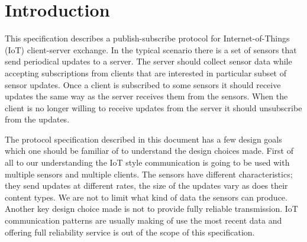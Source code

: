 \chapter{Introduction}
This specification describes a publish-subscribe protocol for Internet-of-Things
(IoT)
client-server exchange. In the typical scenario there is a set of sensors that
send periodical updates to a server. The server should collect sensor data while
accepting subscriptions from clients that are interested in particular subset of
sensor updates. Once a client is subscribed to some sensors it should receive updates
the same way as the server receives them from the sensors. When the client is no
longer willing to receive updates from the server it should unsubscribe from the
updates.

The protocol specification described in this document has a few design goals
which one should be familiar of to understand the design choices made. First of
all to our understanding the IoT style communication is going to be used with
multiple sensors and multiple clients. The sensors have different
characteristics; they send updates at different rates, the size of the updates
vary as does their content types. We are not to limit what kind of data the
sensors can produce. Another key design choice made is not to provide fully
reliable transmission. IoT communication patterns are usually making of use the
most recent data and offering full reliability service is out of the scope of
this specification.
